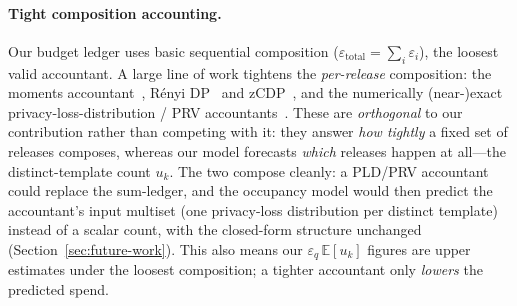 \documentclass[sigconf,nonacm]{acmart}
\newcommand{\eps}{\varepsilon}
\newcommand{\E}{\mathbb{E}}
\begin{document}
\paragraph{Tight composition accounting.}
Our budget ledger uses basic sequential composition ($\eps_{\mathrm{total}}=\sum_i\eps_i$), the loosest valid accountant. A large line of work tightens the \emph{per-release} composition: the moments accountant~\cite{abadi2016deep}, R\'enyi DP~\cite{mironov2017renyi} and zCDP~\cite{bun2016concentrated}, and the numerically (near-)exact privacy-loss-distribution / PRV accountants~\cite{gopi2021prv}. These are \emph{orthogonal} to our contribution rather than competing with it: they answer \emph{how tightly} a fixed set of releases composes, whereas our model forecasts \emph{which} releases happen at all---the distinct-template count $u_k$. The two compose cleanly: a PLD/PRV accountant could replace the sum-ledger, and the occupancy model would then predict the accountant's input multiset (one privacy-loss distribution per distinct template) instead of a scalar count, with the closed-form structure unchanged (Section~\ref{sec:future-work}). This also means our $\eps_q\,\E[u_k]$ figures are upper estimates under the loosest composition; a tighter accountant only \emph{lowers} the predicted spend.
\end{document}
